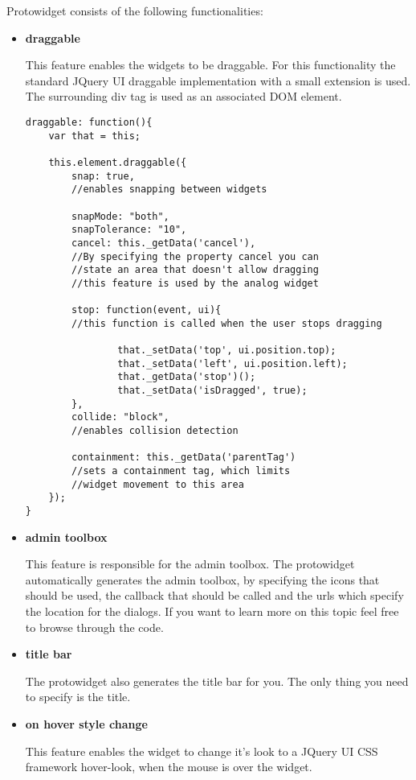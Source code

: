     Protowidget consists of the following functionalities:
    \begin{itemize}
        \item \textbf{draggable}

            This feature enables the widgets to be draggable. For this functionality the standard JQuery UI draggable implementation with a small extension is used. The surrounding div tag is used as an associated DOM element.

\begin{lstlisting}[caption=prototype widget - draggable: ui.protowidget.js ,label=lst:h2h:protowidgetdrag]
draggable: function(){
    var that = this;

	this.element.draggable({
		snap: true,
        //enables snapping between widgets
		
        snapMode: "both",
		snapTolerance: "10",
		cancel: this._getData('cancel'),
        //By specifying the property cancel you can
        //state an area that doesn't allow dragging
        //this feature is used by the analog widget
		
        stop: function(event, ui){
        //this function is called when the user stops dragging

				that._setData('top', ui.position.top);
				that._setData('left', ui.position.left);
				that._getData('stop')();
				that._setData('isDragged', true);
		},
		collide: "block",
        //enables collision detection

		containment: this._getData('parentTag')
        //sets a containment tag, which limits
        //widget movement to this area
	});
}
\end{lstlisting}

        \item \textbf{admin toolbox}

            This feature is responsible for the admin toolbox. The protowidget automatically generates the admin toolbox, by specifying the icons that should be used, the callback that should be called and the urls which specify the location for the dialogs. If you want to learn more on this topic feel free to browse through the code.
        \item \textbf{title bar}

            The protowidget also generates the title bar for you. The only thing you need to specify is the title.
        \item \textbf{on hover style change}

            This feature enables the widget to change it's look to a JQuery UI CSS framework hover-look, when the mouse is over the widget.


\end{itemize}
